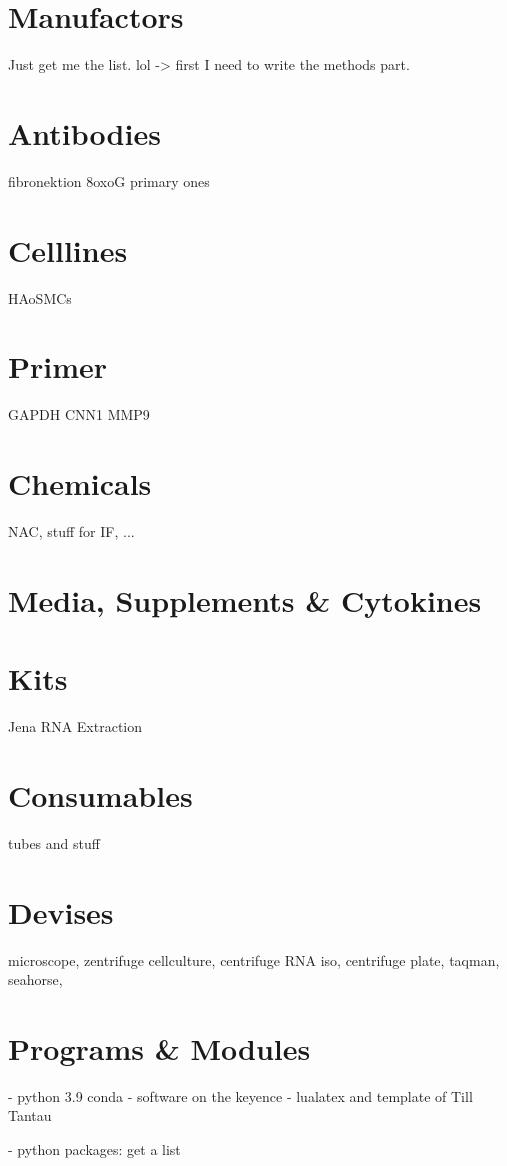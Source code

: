 
\section{Manufactors}
\label{sec:manufactors}
Just get me the list. lol -> first I need to write the methods part.

\section{Antibodies}
\label{sec:ab}
fibronektion
8oxoG
primary ones

\section{Celllines}
\label{sec:cells}
HAoSMCs

\section{Primer}
\label{sec:primer}
GAPDH
CNN1
MMP9

\section{Chemicals}
\label{sec:chemicals}
NAC, stuff for IF, ...

\section{Media, Supplements \& Cytokines}
\label{sec:chemicals}

\section{Kits}
\label{sec:kits}
Jena RNA Extraction

\section{Consumables}
\label{sec:kits}
tubes and stuff

\section{Devises}
\label{sec:devices}
microscope, zentrifuge cellculture, centrifuge RNA iso, centrifuge  plate, taqman, seahorse,

\section{Programs \& Modules}
\label{sec:packages}

- python 3.9 conda
- software on the keyence
- lualatex and template of Till Tantau

- python packages: get a list
